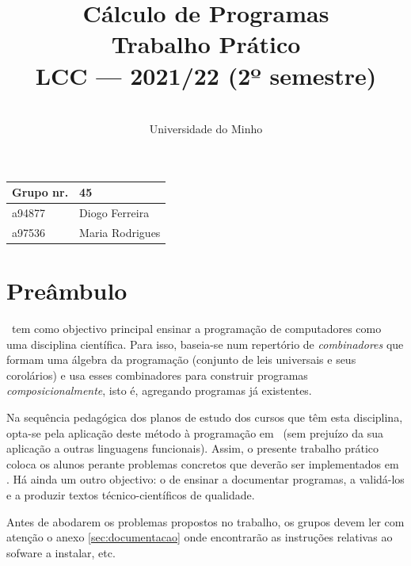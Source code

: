 \documentclass[a4paper]{article}
\title{
          Cálculo de Programas
\\
          Trabalho Prático
\\
          LCC --- 2021/22 (2º semestre)
}
\author{
          \dium
\\
          Universidade do Minho
}
\date\mydate
\begin{document}
\maketitle

\begin{center}\large
\begin{tabular}{ll}
\textbf{Grupo} nr. & 45
\\\hline
a94877 & Diogo Ferreira
\\
a97536 & Maria Rodrigues

\end{tabular}
\end{center}

\section{Preâmbulo}

\CP\ tem como objectivo principal ensinar
a progra\-mação de computadores como uma disciplina científica. Para isso,
baseia-se num repertório de \emph{combinadores} que formam uma álgebra da
programação (conjunto de leis universais e seus corolários) e usa esses
combinadores para construir programas \emph{composicionalmente}, isto é,
agregando programas já existentes.

Na sequência pedagógica dos planos de estudo dos cursos que têm
esta disciplina, opta-se pela aplicação deste método à programação
em \Haskell\ (sem prejuízo da sua aplicação a outras linguagens
funcionais). Assim, o presente trabalho prático coloca os
alunos perante problemas concretos que deverão ser implementados em
\Haskell.  Há ainda um outro objectivo: o de ensinar a documentar
programas, a validá-los e a produzir textos técnico-científicos de
qualidade.

Antes de abodarem os problemas propostos no trabalho, os grupos devem ler
com atenção o anexo \ref{sec:documentacao} onde encontrarão as instruções
relativas ao sofware a instalar, etc.


\Problema
\end{document}
